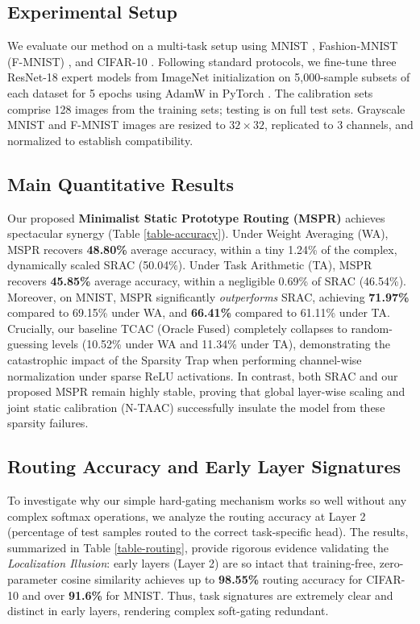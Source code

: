 \documentclass{article}
\theoremstyle{plain}
\theoremstyle{definition}
\theoremstyle{remark}
\begin{document}
\subsection{Experimental Setup}
We evaluate our method on a multi-task setup using MNIST \cite{LeCun1998}, Fashion-MNIST (F-MNIST) \cite{Xiao2017}, and CIFAR-10 \cite{Krizhevsky2009}. Following standard protocols, we fine-tune three ResNet-18 \cite{He2016} expert models from ImageNet \cite{Deng2009} initialization on 5,000-sample subsets of each dataset for 5 epochs using AdamW \cite{Loshchilov2019} in PyTorch \cite{Paszke2019}. The calibration sets comprise 128 images from the training sets; testing is on full test sets. Grayscale MNIST and F-MNIST images are resized to $32 \times 32$, replicated to 3 channels, and normalized to establish compatibility.

\subsection{Main Quantitative Results}
Our proposed \textbf{Minimalist Static Prototype Routing (MSPR)} achieves spectacular synergy (Table \ref{table-accuracy}). Under Weight Averaging (WA), MSPR recovers \textbf{48.80\%} average accuracy, within a tiny 1.24\% of the complex, dynamically scaled SRAC (50.04\%). Under Task Arithmetic (TA), MSPR recovers \textbf{45.85\%} average accuracy, within a negligible 0.69\% of SRAC (46.54\%). Moreover, on MNIST, MSPR significantly \textit{outperforms} SRAC, achieving \textbf{71.97\%} compared to 69.15\% under WA, and \textbf{66.41\%} compared to 61.11\% under TA. Crucially, our baseline TCAC (Oracle Fused) completely collapses to random-guessing levels (10.52\% under WA and 11.34\% under TA), demonstrating the catastrophic impact of the Sparsity Trap when performing channel-wise normalization under sparse ReLU activations. In contrast, both SRAC and our proposed MSPR remain highly stable, proving that global layer-wise scaling and joint static calibration (N-TAAC) successfully insulate the model from these sparsity failures.

\subsection{Routing Accuracy and Early Layer Signatures}
To investigate why our simple hard-gating mechanism works so well without any complex softmax operations, we analyze the routing accuracy at Layer 2 (percentage of test samples routed to the correct task-specific head). The results, summarized in Table \ref{table-routing}, provide rigorous evidence validating the \textit{Localization Illusion}: early layers (Layer 2) are so intact that training-free, zero-parameter cosine similarity achieves up to \textbf{98.55\%} routing accuracy for CIFAR-10 and over \textbf{91.6\%} for MNIST. Thus, task signatures are extremely clear and distinct in early layers, rendering complex soft-gating redundant.
\end{document}
